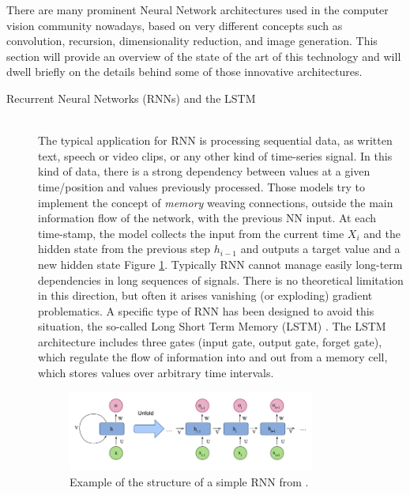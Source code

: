 There are many prominent Neural Network architectures used in the computer vision community nowadays, based on very different concepts such as convolution, recursion, dimensionality reduction, and image generation. This section will provide an overview of the state of the art of this technology and will dwell briefly on the details behind some of those innovative architectures.

\begin{description}
    \item [Recurrent Neural Networks (RNNs) and the LSTM] \hfill \\
        The typical application for RNN is processing sequential data, as written text, speech or video clips, or any other kind of time-series signal. In this kind of data, there is a strong dependency between values at a given time/position and values previously processed. Those models try to implement the concept of \textit{memory} weaving connections, outside the main information flow of the network, with the previous NN input. At each time-stamp, the model collects the input from the current time $X_i$ and the hidden state from the previous step $h_{i-1}$ and outputs a target value and a new hidden state Figure \ref{fig:recNN}. Typically RNN cannot manage easily long-term dependencies in long sequences of signals. There is no theoretical limitation in this direction, but often it arises vanishing (or exploding) gradient problematics. A specific type of RNN has been designed to avoid this situation, the so-called Long Short Term Memory (LSTM) \cite{LSTM}. The LSTM architecture includes three gates (input gate, output gate, forget gate), which regulate the flow of information into and out from a memory cell, which stores values over arbitrary time intervals.

        \begin{figure}
            \centering
            \includegraphics[width = 0.8\textwidth]{images/recNN}
            \caption{Example of the structure of a simple RNN from  \cite{deep_seg_SOA}.}
            \label{fig:recNN}
        \end{figure}


\end{description}
